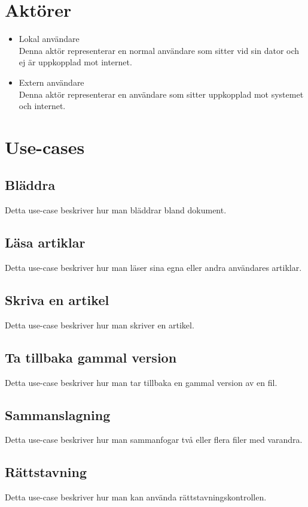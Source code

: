 \section{Aktörer}
\begin{itemize}
	\item Lokal användare
	\\Denna aktör representerar en normal användare som sitter vid sin dator och ej är uppkopplad mot internet.
	\item Extern användare
	\\Denna aktör representerar en användare som sitter uppkopplad mot systemet och internet.
\end{itemize}
\section{Use-cases}
\subsection{Bläddra}
Detta use-case beskriver hur man bläddrar bland dokument.
\subsection{Läsa artiklar}
Detta use-case beskriver hur man läser sina egna eller andra användares artiklar.
\subsection{Skriva en artikel}
Detta use-case beskriver hur man skriver en artikel.
\subsection{Ta tillbaka gammal version}
Detta use-case beskriver hur man tar tillbaka en gammal version av en fil.
\subsection{Sammanslagning}
Detta use-case beskriver hur man sammanfogar två eller flera filer med varandra.
\subsection{Rättstavning}
Detta use-case beskriver hur man kan använda rättstavningskontrollen.

